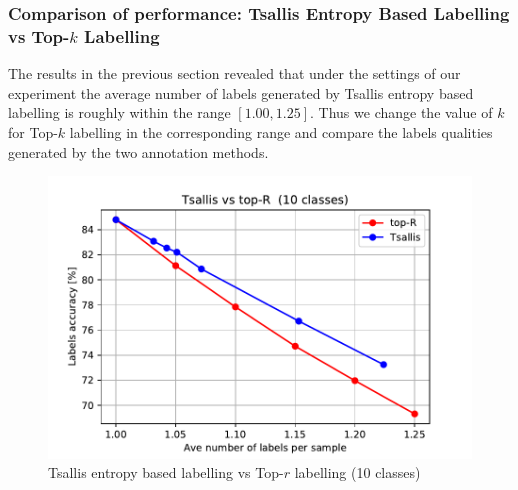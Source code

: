 \documentclass[a4paper,conference]{IEEEtran}
\begin{document}
\subsubsection{Comparison of performance: Tsallis Entropy Based Labelling vs Top-$k$ Labelling}\label{sec:results}
The results in the previous section revealed that under the settings of our experiment the average number of labels generated by Tsallis entropy based labelling is roughly within the range $[1.00,  1.25]$.
Thus we change the value of $k$ for Top-$k$ labelling in the corresponding range and compare the labels qualities generated by the two annotation methods.

\begin{figure}[t]
\begin{center}
    \includegraphics[width=1.0\linewidth]{figs/graphs/tsallis-vs-Top-R-10cls.pdf}
    \caption{Tsallis entropy based labelling vs Top-$r$ labelling (10 classes)}
    \label{fig:exp_10cls}
\end{center}
\end{figure}
\end{document}
